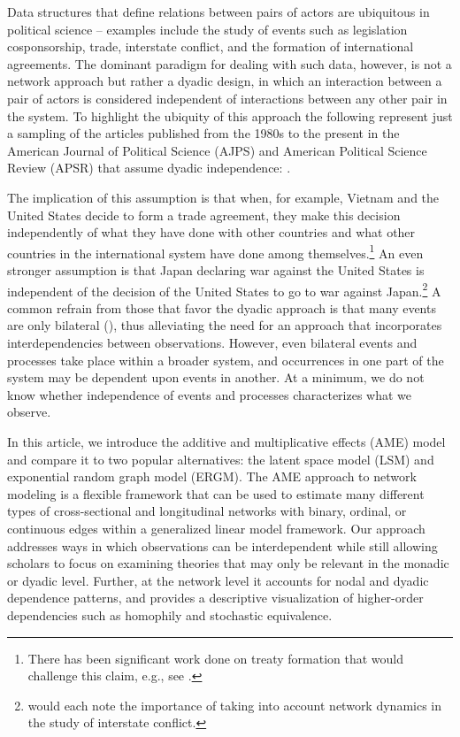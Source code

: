 \documentclass[12pt,pdflatex]{elsarticle}
\begin{document}
\newpage\setcounter{page}{1} 

Data structures that define relations between pairs of actors are ubiquitous in political science -- examples include the study of events such as legislation cosponsorship, trade, interstate conflict, and the formation of international agreements. The dominant paradigm for dealing with such data, however, is not a network approach but rather a dyadic design, in which an interaction between a pair of actors is considered independent of interactions between any other pair in the system. To highlight the ubiquity of this approach the following represent just a sampling of the articles published from the 1980s to the present in the American Journal of Political Science (AJPS) and American Political Science Review (APSR) that assume dyadic independence: \citet{dixon:1983,mansfield:etal:2000,lemke:reed:2001a,mitchell:2002,dafoe:2011a,fuhrmann:sechser:2014,carnegie:2014}.

The implication of this assumption is that when, for example, Vietnam and the United States decide to form a trade agreement, they make this decision independently of what they have done with other countries and what other countries in the international system have done among themselves.\footnote{There has been significant work done on treaty formation that would challenge this claim, e.g., see \citet{manger:etal:2012,kinne:2013}.} An even stronger assumption is that Japan declaring war against the United States is independent of the decision of the United States to go to war against Japan.\footnote{\citet{maoz:etal:2006,minhas:etal:2016} would each note the importance of taking into account network dynamics in the study of interstate conflict.} A common refrain from those that favor the dyadic approach is that many events are only bilateral (\citealt{diehl:wright:2016}), thus alleviating the need for an approach that incorporates interdependencies between observations. However, even bilateral events and processes take place within a broader system, and occurrences in one part of the system may be dependent upon events in another. At a minimum, we do not know whether independence of events and processes characterizes what we observe. 

In this article, we introduce the additive and multiplicative effects (AME) model and compare it to two popular alternatives: the latent space model (LSM) and exponential random graph model (ERGM). The AME approach to network modeling is a flexible framework that can be used to estimate many different types of cross-sectional and longitudinal networks with binary, ordinal, or continuous edges within a generalized linear model framework. Our approach addresses ways in which observations can be interdependent while still allowing scholars to focus on examining theories that may only be relevant in the monadic or dyadic level. Further, at the network level it accounts for nodal and dyadic dependence patterns, and provides a descriptive visualization of higher-order dependencies such as homophily and stochastic equivalence. 
\end{document}
